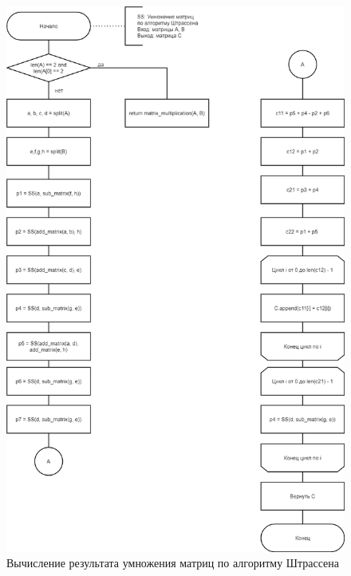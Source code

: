 \begin{figure}[H]
	\begin{center}
		\includegraphics[scale=0.4]{img/strassen.png}
	\end{center}
	\captionsetup{justification=centering}
	\caption{Вычисление результата умножения матриц по алгоритму Штрассена}
	\label{img:strassen}
\end{figure}

